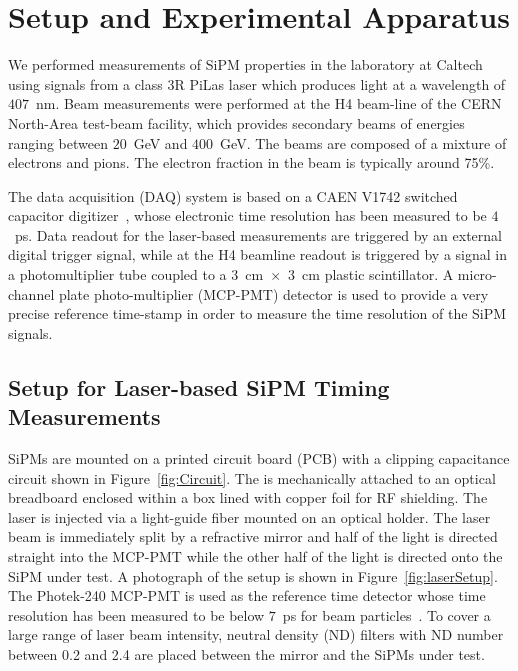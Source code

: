 \section{Setup and Experimental Apparatus }
\label{sec:setup}

We performed measurements of SiPM properties in the laboratory at Caltech using
signals from a class 3R PiLas laser which produces light at a wavelength of
$407$~nm. Beam measurements were performed at the H4 beam-line of the CERN
North-Area test-beam facility, which provides secondary beams of energies
ranging between $20$~GeV and $400$~GeV. The beams are composed of a mixture of
electrons and pions. The electron fraction in the beam is typically around 75\%.

The data acquisition (DAQ) system is based on a CAEN V1742 switched capacitor
digitizer~\cite{DRS4}, whose electronic time resolution has been measured to be
$4$~ps. Data readout for the laser-based measurements are triggered by an
external digital trigger signal, while at the H4 beamline readout is triggered
by a signal in a photomultiplier tube coupled to a
$3$~$\mathrm{cm}$~$\times$~$3$~$\mathrm{cm}$ plastic scintillator. 
A micro-channel plate photo-multiplier (MCP-PMT) detector is used to provide a
very precise reference time-stamp in order to measure the time resolution of the 
SiPM signals.

\subsection{Setup for Laser-based SiPM Timing Measurements}

SiPMs are mounted on a printed circuit board (PCB) with a clipping capacitance
circuit shown in Figure~\ref{fig:Circuit}. The is mechanically attached to an
optical breadboard enclosed within a box lined with copper foil for RF
shielding. The laser is injected via a light-guide fiber mounted on an optical
holder. The laser beam is immediately split by a refractive mirror and half of
the light is directed straight into the MCP-PMT while the other half of the
light is directed onto the SiPM under test. A photograph of the setup is shown
in Figure~\ref{fig:laserSetup}. The Photek-240 MCP-PMT is used as the reference
time detector whose time resolution has been measured to be below $7$~ps for
beam particles~\cite{MCPShowerMaxPaper}. To cover a large range of laser beam
intensity, neutral density (ND) filters with ND number between 0.2 and 2.4
are placed between the mirror and the SiPMs under test.

